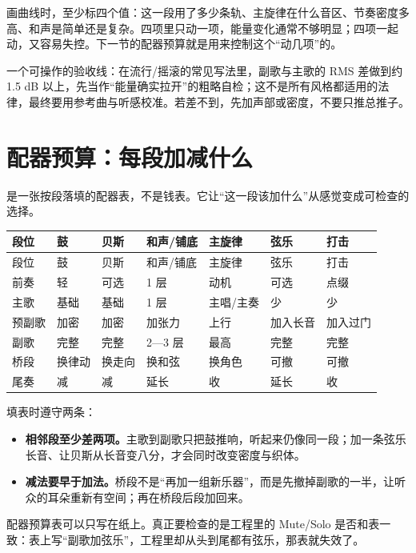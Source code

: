 画曲线时，至少标四个值：这一段用了多少条轨、主旋律在什么音区、节奏密度多高、和声是简单还是复杂。四项里只动一项，能量变化通常不够明显；四项一起动，又容易失控。下一节的配器预算就是用来控制这个“动几项”的。

一个可操作的验收线：在流行/摇滚的常见写法里，副歌与主歌的 RMS 差做到约 1.5 dB 以上，先当作“能量确实拉开”的粗略自检；这不是所有风格都适用的法律，最终要用参考曲与听感校准。若差不到，先加声部或密度，不要只推总推子。

\section{配器预算：每段加减什么}
\label{sec:instrumentation-budget}

是一张按段落填的配器表，不是钱表。它让“这一段该加什么”从感觉变成可检查的选择。

\begin{longtable}{p{}p{}p{}p{}p{}p{}p{}}
\toprule
段位 & 鼓 & 贝斯 & 和声/铺底 & 主旋律 & 弦乐 & 打击 \\
\midrule
\endfirsthead
\toprule
段位 & 鼓 & 贝斯 & 和声/铺底 & 主旋律 & 弦乐 & 打击 \\
\midrule
\endhead
前奏 & 轻 & 可选 & 1 层 & 动机 & 可选 & 点缀 \\
主歌 & 基础 & 基础 & 1 层 & 主唱/主奏 & 少 & 少 \\
预副歌 & 加密 & 加密 & 加张力 & 上行 & 加入长音 & 加入过门 \\
副歌 & 完整 & 完整 & 2—3 层 & 最高 & 完整 & 完整 \\
桥段 & 换律动 & 换走向 & 换和弦 & 换角色 & 可撤 & 可撤 \\
尾奏 & 减 & 减 & 延长 & 收 & 延长 & 收 \\
\bottomrule
\end{longtable}

填表时遵守两条：

\begin{itemize}
\item \textbf{相邻段至少差两项。}主歌到副歌只把鼓推响，听起来仍像同一段；加一条弦乐长音、让贝斯从长音变八分，才会同时改变密度与织体。
\item \textbf{减法要早于加法。}桥段不是“再加一组新乐器”，而是先撤掉副歌的一半，让听众的耳朵重新有空间；再在桥段后段加回来。
\end{itemize}

\begin{tipbox}
配器预算表可以只写在纸上。真正要检查的是工程里的 Mute/Solo 是否和表一致：表上写“副歌加弦乐”，工程里却从头到尾都有弦乐，那表就失效了。
\end{tipbox}

